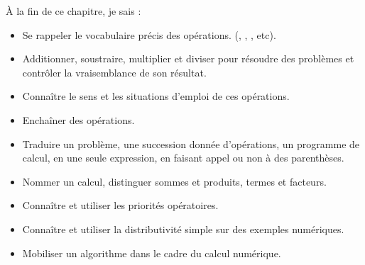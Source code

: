 \begin{objectifs}
À la fin de ce chapitre, je sais :
\begin{itemize}[label=\textbullet]

    \item Se rappeler le vocabulaire précis des opérations. (,
        , , etc).
    \item Additionner, soustraire, multiplier et diviser pour résoudre des
        problèmes et contrôler la vraisemblance de son résultat.
    \item Connaître le sens et les situations d'emploi de ces opérations.
    \item Enchaîner des opérations.
    \item Traduire un problème, une succession donnée d’opérations, un programme
        de calcul, en une seule expression, en faisant appel ou non à des
        parenthèses.
    \item Nommer un calcul, distinguer sommes et produits, termes et facteurs.
    \item Connaître et utiliser les priorités opératoires.
    \item Connaître et utiliser la distributivité simple sur des exemples
        numériques.
    \item Mobiliser un algorithme dans le cadre du calcul numérique.

\end{itemize}
\end{objectifs}



